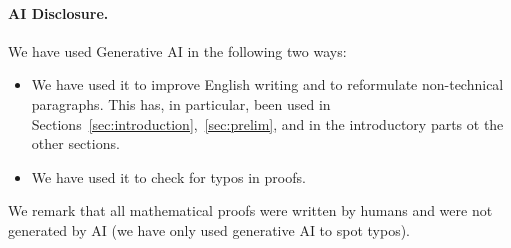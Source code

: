 \documentclass{article}
\begin{document}
\newpage

\tableofcontents

\newpage










% 









\newpage
\appendix



\newpage



\newpage



\newpage 

 

\newpage



\newpage

\paragraph{AI Disclosure.} We have used Generative AI in the following two ways:
\begin{itemize}
    \item We have used it to improve English writing and to reformulate non-technical paragraphs. This has, in particular, been used in Sections~\ref{sec:introduction},~\ref{sec:prelim}, and in the introductory parts ot the other sections. 
    \item We have used it to check for typos in proofs.
\end{itemize}
We remark that all mathematical proofs were written by humans and were not generated by AI (we have only used generative AI to spot typos).
\end{document}
